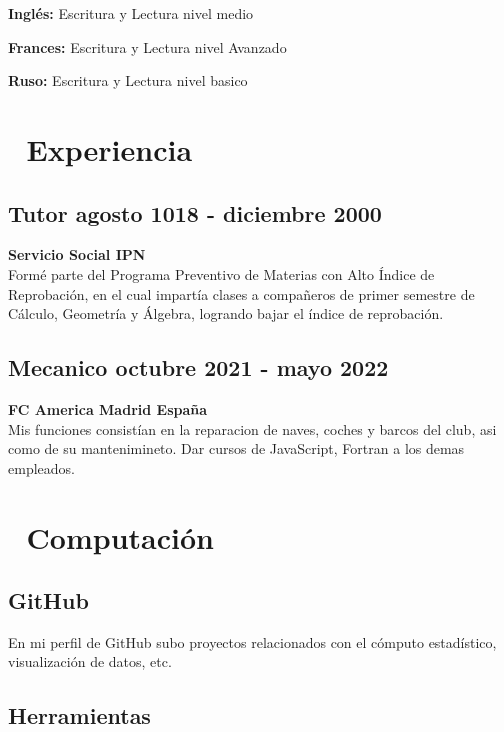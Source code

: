 \documentclass[11pt,a4paper]{article}
\begin{document}
\textbf{Inglés: }  Escritura y Lectura nivel medio

\noindent\textbf{Frances: }  Escritura y Lectura nivel Avanzado

\noindent\textbf{Ruso: }  Escritura y Lectura nivel basico


\textcolor{line}{\hline}


\section*{{\ttfamily  }Experiencia }

\subsection*{Tutor \hfill {\small\textbf{agosto 1018 - diciembre 2000}} }
{\small \textbf{Servicio Social \hfill IPN}}\\
 Formé parte del Programa Preventivo de Materias con Alto Índice de Reprobación, en el cual impartía clases
a compañeros de primer semestre de Cálculo, Geometría y Álgebra, logrando bajar el índice de
reprobación.

\subsection*{Mecanico \hfill {\small octubre 2021 - mayo 2022}}
{\small \textbf{FC America \hfill Madrid España}}\\
Mis funciones consistían en la reparacion de naves, coches y barcos del club, asi como de su mantenimineto. Dar cursos de JavaScript, Fortran a los demas empleados.

\textcolor{line}{\hline}


\section*{{\ttfamily  }Computación}

\subsection*{GitHub}

En mi perfil de GitHub subo proyectos relacionados con el cómputo estadístico, visualización de datos, etc.

\subsection*{Herramientas}
\end{document}
